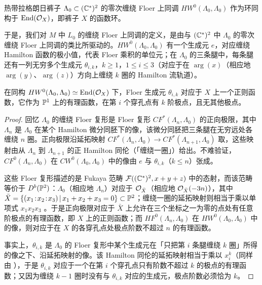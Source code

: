 \begin{prop}\label{prop:HW0}
热带拉格朗日裤子 $\Lambda_0\subset(\mathbb{C}^*)^2$ 的零次缠绕 Floer 上同调 $HW^0(\Lambda_0,\Lambda_0)$ 作为环同构于 $\operatorname{End}(\mathcal{O}_X)$，即裤子 $X$ 的函数环。
\end{prop}

于是，我们对 $M$ 中 $L_0$ 的缠绕 Floer 上同调的定义，是由与 $(\mathbb{C}^*)^2$ 中 $\Lambda_0$ 的零次缠绕 Floer 上同调的类比所驱动的。$HW^0(\Lambda_0,\Lambda_0)$ 有一个生成元 $e$，对应缠绕 Hamilton 函数的极小值，代表 Floer 乘积的单位元；在 $\Lambda_0$ 的三条腿中，每条腿还有一列无穷多个生成元 $\theta_{i,k}$，$k\ge 1$，$1\le i\le 3$（对应于在 $\arg(x)$（相应地 $\arg(y)$、$\arg(z)$）方向上缠绕 $k$ 圈的 Hamilton 流轨道）。

\begin{lemma}\label{l:floergens_as_rationalfunctions}
在同构 $HW^0(\Lambda_0,\Lambda_0)\simeq\operatorname{End}(\mathcal{O}_X)$ 下，Floer 生成元 $\theta_{i,k}$ 对应于 $X$ 上一个正则函数，它作为 $\mathbb{P}^1$ 上的有理函数，在第 $i$ 个穿孔点有 $k$ 阶极点，且无其他极点。
\end{lemma}

\begin{proof}
回忆 $\Lambda_0$ 的缠绕 Floer 复形是 Floer 复形 $CF^*(\Lambda_n,\Lambda_0)$ 的正向极限，其中 $\Lambda_n$ 是 $\Lambda_0$ 在某个 Hamilton 微分同胚下的像，该微分同胚把三条腿在无穷远处各缠绕 $n$ 圈。正向极限沿延拓映射 $CF^*(\Lambda_n,\Lambda_0)\to CF^*(\Lambda_{n+1},\Lambda_0)$ 取，这些映射由从 $\Lambda_n$ 到 $\Lambda_{n+1}$ 的正 Hamilton 同伦（「缠绕一圈」）给出。不难验证，$CF^0(\Lambda_n,\Lambda_0)$ 在 $CW^0(\Lambda_0,\Lambda_0)$ 中的像由 $e$ 与 $\theta_{i,k}$（$k\le n$）张成。

这些 Floer 复形描述的是 Fukaya 范畴 $\mathcal{F}((\mathbb{C}^*)^2,x+y+z)$ 中的态射，而该范畴等价于 $D^b(\mathbb{P}^2)$：$\Lambda_0$（相应地 $\Lambda_n$）对应于 $\mathcal{O}_{\bar X}$（相应地 $\mathcal{O}_{\bar X}(-3n)$），其中 $\bar X=\{(x_1\!:\!x_2\!:\!x_3)\,|\,x_1+x_2+x_3=0\}\subset\mathbb{P}^2$；缠绕一圈的延拓映射则相当于乘以单项式 $x_1x_2x_3$ \cite{Hanlon}。于是正向极限对应于 $\bar X$ 上允许在三个坐标之一为零的点处有任意阶极点的有理函数，即 $X$ 上的正则函数；而 $HF^0(\Lambda_n,\Lambda_0)$ 在 $HW^0(\Lambda_0,\Lambda_0)$ 中的像，则对应于在 $X$ 的各穿孔点处极点阶数不超过 $n$ 的有理函数。

事实上，$\theta_{i,k}$ 是 $\Lambda_0$ 的 Floer 复形中某个生成元在「只把第 $i$ 条腿缠绕 $k$ 圈」所得的像之下、沿延拓映射的像。该 Hamilton 同伦的延拓映射相当于乘以 $x_i^k$（同样由 \cite{Hanlon}），于是 $\theta_{i,k}$ 对应于一个在第 $i$ 个穿孔点只有阶数不超过 $k$ 的极点的有理函数；又因为缠绕 $k-1$ 圈时没有与 $\theta_{i,k}$ 对应的生成元，极点阶数必须恰为 $k$。
\end{proof}

